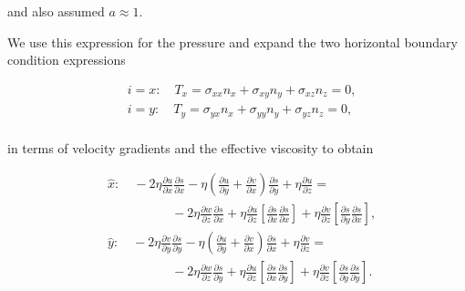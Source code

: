 \noindent

and also assumed $a \approx 1$.


We use this expression for the pressure and expand the two horizontal boundary condition expressions

\begin{equation}
\begin{split}
 & i=x:\quad T_{x}=\sigma _{xx}n_{x}+\sigma _{xy}n_{y}+\sigma _{xz}n_{z}=0, \\ 
 & i=y:\quad T_{y}=\sigma _{yx}n_{x}+\sigma _{yy}n_{y}+\sigma _{yz}n_{z}=0, \\
\end{split}
 \end{equation}

in terms of velocity gradients and the effective viscosity to obtain

\begin{equation}
\begin{split}
   {} & \hat{x}:\quad -2\eta \frac{\partial u}{\partial x}\frac{\partial s}{\partial x}-\eta \left( \frac{\partial u}{\partial y}+\frac{\partial v}{\partial x} \right)\frac{\partial s}{\partial y}+\eta \frac{\partial u}{\partial z}=  \\
   {} & \quad \quad \quad \quad \quad -2\eta \frac{\partial w}{\partial z}\frac{\partial s}{\partial x}+\eta \frac{\partial u}{\partial z}\left[ \frac{\partial s}{\partial x}\frac{\partial s}{\partial x} \right]+\eta \frac{\partial v}{\partial z}\left[ \frac{\partial s}{\partial y}\frac{\partial s}{\partial x} \right],  \\
%
   {} & \hat{y}:\quad -2\eta \frac{\partial v}{\partial y}\frac{\partial s}{\partial y}-\eta \left( \frac{\partial u}{\partial y}+\frac{\partial v}{\partial x} \right)\frac{\partial s}{\partial x}+\eta \frac{\partial v}{\partial z}=  \\
   {} & \quad \quad \quad \quad \quad -2\eta \frac{\partial w}{\partial z}\frac{\partial s}{\partial y}+\eta \frac{\partial u}{\partial z}\left[ \frac{\partial s}{\partial x}\frac{\partial s}{\partial y} \right]+\eta \frac{\partial v}{\partial z}\left[ \frac{\partial s}{\partial y}\frac{\partial s}{\partial y} \right].  \\
\end{split}
\end{equation}

